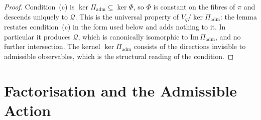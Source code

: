 \documentclass[11pt,a4paper]{article}
\theoremstyle{remark}
\begin{document}
  \begin{proof}
    Condition~(c) is $\ker \Pi_{\mathrm{adm}} \subseteq \ker \Phi$, so $\Phi$ is constant on the
    fibres of $\pi$ and descends uniquely to $\mathcal{Q}$.
    This is the universal property of $V_q / \ker \Pi_{\mathrm{adm}}$: the lemma restates
    condition~(c) in the form used below and adds nothing to it.
    In particular it produces $\mathcal{Q}$, which is canonically isomorphic to
    $\mathrm{Im}\,\Pi_{\mathrm{adm}}$, and no further intersection.
    The kernel $\ker \Pi_{\mathrm{adm}}$ consists of the directions invisible to admissible
    observables, which is the structural reading of the condition.
  \end{proof}

  \section{Factorisation and the Admissible Action}
  \label{sec:rigidity}
\end{document}

